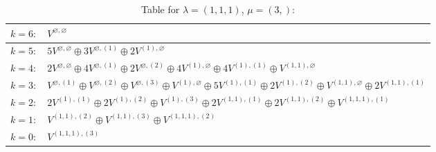 \documentclass[a4paper,12pt]{article}
\begin{document}
\renewcommand{\arraystretch}{1.6} 
\begin{table}[H]
\centering
\caption{Table for $\lambda = (1, 1, 1)$, $\mu = (3,)$:}
\begin{tabular}{|>{\centering\arraybackslash}p{15cm}|}
\hline
 $k = 6: \quad V^{\varnothing, \varnothing} $ \\ \hline
 $k = 5: \quad 5 V^{\varnothing, \varnothing} \oplus 3 V^{\varnothing, (1)} \oplus 2 V^{(1), \varnothing} $ \\ \hline
 $k = 4: \quad 2 V^{\varnothing, \varnothing} \oplus 4 V^{\varnothing, (1)} \oplus 2 V^{\varnothing, (2)} \oplus 4 V^{(1), \varnothing} \oplus 4 V^{(1), (1)} \oplus V^{(1, 1), \varnothing} $ \\ \hline
 $k = 3: \quad V^{\varnothing, (1)} \oplus V^{\varnothing, (2)} \oplus V^{\varnothing, (3)} \oplus V^{(1), \varnothing} \oplus 5 V^{(1), (1)} \oplus 2 V^{(1), (2)} \oplus V^{(1, 1), \varnothing} \oplus 2 V^{(1, 1), (1)} $ \\ \hline
 $k = 2: \quad 2 V^{(1), (1)} \oplus 2 V^{(1), (2)} \oplus V^{(1), (3)} \oplus 2 V^{(1, 1), (1)} \oplus 2 V^{(1, 1), (2)} \oplus V^{(1, 1, 1), (1)} $ \\ \hline
 $k = 1: \quad V^{(1, 1), (2)} \oplus V^{(1, 1), (3)} \oplus V^{(1, 1, 1), (2)} $ \\ \hline
 $k = 0: \quad V^{(1, 1, 1), (3)} $ \\ \hline
\end{tabular}
\end{table}
\end{document}
